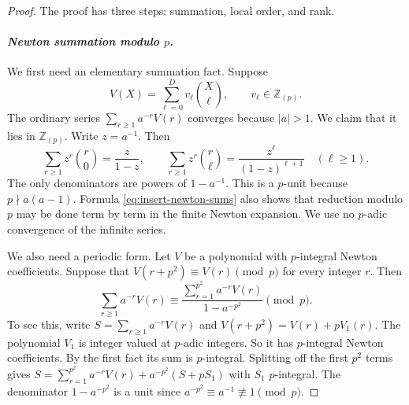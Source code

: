 \begin{proof}
The proof has three steps: summation, local order, and rank.

\paragraph{\emph{Newton summation modulo $p$.}}
We first need an elementary summation fact.  Suppose
\[
 V(X)=\sum_{\ell=0}^{D}v_\ell\binom X\ell,
 \qquad v_\ell\in\mathbb Z_{(p)}.
\]
The ordinary series $\sum_{r\geq1}a^{-r}V(r)$ converges because $|a|>1$.
We claim that it lies in $\mathbb Z_{(p)}$.  Write $z=a^{-1}$.  Then
\begin{equation}
 \sum_{r\geq1}z^r\binom r0=\frac z{1-z},
 \qquad
 \sum_{r\geq1}z^r\binom r\ell
 =\frac{z^\ell}{(1-z)^{\ell+1}}\quad(\ell\geq1).
 \label{eq:insert-newton-sums}
\end{equation}
The only denominators are powers of $1-a^{-1}$.  This is a $p$-unit because
$p\nmid a(a-1)$.  Formula \eqref{eq:insert-newton-sums} also shows that
reduction modulo $p$ may be done term by term in the finite Newton
expansion.  We use no $p$-adic convergence of the infinite series.

We also need a periodic form.  Let $V$ be a polynomial with
$p$-integral Newton coefficients.  Suppose that
$V(r+p^2)\equiv V(r)\pmod p$ for every integer $r$.  Then
\begin{equation}
 \sum_{r\geq1}a^{-r}V(r)
 \equiv
 \frac{\displaystyle\sum_{r=1}^{p^2}a^{-r}V(r)}
      {1-a^{-p^2}}\pmod p.
 \label{eq:insert-periodic-sum}
\end{equation}
To see this, write $S=\sum_{r\geq1}a^{-r}V(r)$ and
$V(r+p^2)=V(r)+pV_1(r)$.  The polynomial $V_1$ is integer valued at
$p$-adic integers.  So it has $p$-integral Newton coefficients.  By the
first fact its sum is $p$-integral.  Splitting off the first $p^2$ terms gives
$S=\sum_{r=1}^{p^2}a^{-r}V(r)+a^{-p^2}(S+pS_1)$ with $S_1$ $p$-integral.
The denominator $1-a^{-p^2}$ is a unit since
$a^{-p^2}\equiv a^{-1}\not\equiv1\pmod p$.


\end{proof}
